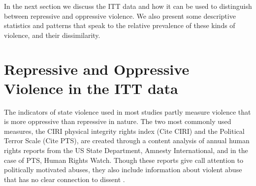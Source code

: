 \documentclass[11pt]{article}
\begin{document}
In the next section we discuss the ITT data and how it can be used to distinguish between repressive and oppressive violence. We also present some descriptive statistics and patterns that speak to the relative prevalence of these kinds of violence, and their dissimilarity. 


\section*{Repressive and Oppressive Violence in the ITT data} 
The indicators of state violence used in most studies partly measure violence that is more oppressive than repressive in nature. The two most commonly used measures, the CIRI physical integrity rights index (Cite CIRI) and the Political Terror Scale (Cite PTS), are created through a content analysis of annual human rights reports from the US State Department, Amnesty International, and in the case of PTS, Human Rights Watch. Though these reports give call attention to politically motivated abuses, they also include information about violent abuse that has no clear connection to dissent \citep[][pp.\ 13--16, 90--91]{Haschke2018}. 
\end{document}
